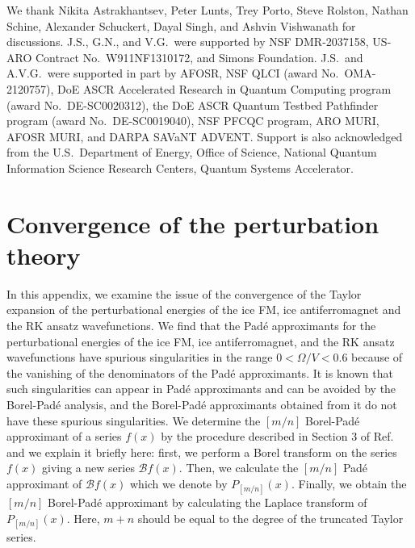 \documentclass[twocolumn,superscriptaddress,amsmath,amssymb,aps,prx,nofootinbib]{revtex4-2}
\begin{document}
\begin{acknowledgments}
We thank Nikita Astrakhantsev, Peter Lunts, Trey Porto, Steve Rolston, Nathan Schine, Alexander Schuckert, Dayal Singh, and Ashvin Vishwanath for discussions. J.S., G.N., and V.G.~were  supported by NSF DMR-2037158, US-ARO Contract No.~W911NF1310172, and Simons Foundation. J.S.~and A.V.G.~were supported in part by AFOSR, NSF QLCI (award No.~OMA-2120757), DoE ASCR Accelerated Research in Quantum Computing program (award No.~DE-SC0020312), the DoE ASCR Quantum Testbed Pathfinder program (award No.~DE-SC0019040), NSF PFCQC program, ARO MURI, AFOSR MURI, and DARPA SAVaNT ADVENT. Support is also acknowledged from the U.S.~Department of Energy, Office of Science, National Quantum Information Science Research Centers, Quantum Systems Accelerator.  

\end{acknowledgments}



\appendix

\section{Convergence of the perturbation theory}\label{app:perturbation}

In this appendix, we examine the issue of the convergence of the Taylor expansion of the perturbational energies of the ice FM, ice antiferromagnet and the RK ansatz wavefunctions. 
We find that the Pad\'e approximants for the perturbational energies of the ice FM, ice antiferromagnet, and the RK ansatz wavefunctions  have spurious singularities in the range $0 < \Omega/V < 0.6$ because of the vanishing of the denominators of the Pad\'e approximants. 
It is known that such singularities can appear in Pad\'e approximants and can be avoided by the Borel-Pad\'e analysis, and the Borel-Pad\'e approximants obtained from it do not have these spurious singularities. 
We determine the $[m/n]$ Borel-Pad\'e approximant of a series $f(x)$ by the procedure described in Section 3 of Ref.~\cite{deeb2016comparison} and we explain it briefly here: first, we perform a Borel transform on the series $f(x)$ giving a new series $\mathcal{B}f(x)$. Then, we calculate the $[m/n]$ Pad\'e approximant of $\mathcal{B}f(x)$ which we denote by $P_{[m/n]}(x)$. 
Finally, we obtain the $[m/n]$ Borel-Pad\'e approximant by calculating the Laplace transform of $P_{[m/n]}(x)$.
Here, $m+n$ should be equal to the degree of the truncated Taylor series. 
\end{document}
